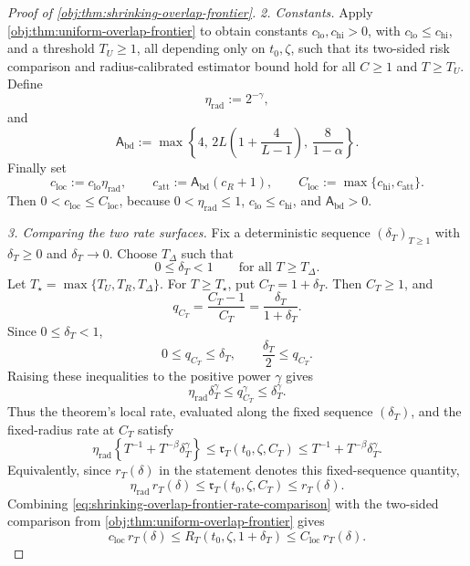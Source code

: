 \documentclass[11pt]{article}
\begin{document}
\begin{proof}[Proof of \cref{obj:thm:shrinking-overlap-frontier}]
\emph{2. Constants.}
Apply \cref{obj:thm:uniform-overlap-frontier} to obtain constants
\(c_{\mathrm{lo}},c_{\mathrm{hi}}>0\), with
\(c_{\mathrm{lo}}\le c_{\mathrm{hi}}\), and a threshold \(T_U\ge1\), all
depending only on \(t_0,\zeta\), such that its two-sided risk comparison and
radius-calibrated estimator bound hold for all \(C\ge1\) and \(T\ge T_U\).
Define
\[
\eta_{\mathrm{rad}}:=2^{-\gamma},
\]
and
\[
\mathsf A_{\mathrm{bd}}
:=
\max\left\{
4,\,
2L\left(1+\frac{4}{L-1}\right),\,
\frac{8}{1-\alpha}
\right\}.
\]
Finally set
\[
c_{\mathrm{loc}}:=c_{\mathrm{lo}}\eta_{\mathrm{rad}},
\qquad
c_{\mathrm{att}}:=\mathsf A_{\mathrm{bd}}(c_R+1),
\qquad
C_{\mathrm{loc}}:=\max\{c_{\mathrm{hi}},c_{\mathrm{att}}\}.
\]
Then \(0<c_{\mathrm{loc}}\le C_{\mathrm{loc}}\), because
\(0<\eta_{\mathrm{rad}}\le1\), \(c_{\mathrm{lo}}\le c_{\mathrm{hi}}\), and
\(\mathsf A_{\mathrm{bd}}>0\). %

\emph{3. Comparing the two rate surfaces.}
Fix a deterministic sequence \((\delta_T)_{T\ge1}\) with
\(\delta_T\ge0\) and \(\delta_T\to0\).  Choose \(T_\Delta\) such that
\[
0\le\delta_T<1\qquad\text{for all }T\ge T_\Delta .
\]
Let \(T_\star=\max\{T_U,T_R,T_\Delta\}\).  For \(T\ge T_\star\), put
\(C_T=1+\delta_T\).  Then \(C_T\ge1\), and
\[
q_{C_T}
=
\frac{C_T-1}{C_T}
=
\frac{\delta_T}{1+\delta_T}.
\]
Since \(0\le\delta_T<1\),
\[
0\le q_{C_T}\le\delta_T,
\qquad
\frac{\delta_T}{2}\le q_{C_T}.
\]
Raising these inequalities to the positive power \(\gamma\) gives
\[
\eta_{\mathrm{rad}}\delta_T^\gamma
\le
q_{C_T}^\gamma
\le
\delta_T^\gamma .
\]
Thus the theorem's local rate, evaluated along the fixed sequence \((\delta_T)\), and the fixed-radius rate at \(C_T\) satisfy
\begin{equation}\label{eq:shrinking-overlap-frontier-rate-comparison}
\eta_{\mathrm{rad}}\left\{T^{-1}+T^{-\beta}\delta_T^\gamma\right\}
\le
\mathfrak r_T(t_0,\zeta,C_T)
\le
T^{-1}+T^{-\beta}\delta_T^\gamma.
\end{equation}
Equivalently, since \(r_T(\delta)\) in the statement denotes this fixed-sequence quantity,
\[
\eta_{\mathrm{rad}}\,r_T(\delta)
\le
\mathfrak r_T(t_0,\zeta,C_T)
\le
r_T(\delta).
\]
Combining \cref{eq:shrinking-overlap-frontier-rate-comparison} with the two-sided comparison from
\cref{obj:thm:uniform-overlap-frontier} gives
\begin{equation}\label{eq:shrinking-overlap-frontier-risk-comparison}
c_{\mathrm{loc}}\,r_T(\delta)
\le
R_T(t_0,\zeta,1+\delta_T)
\le
C_{\mathrm{loc}}\,r_T(\delta).
\end{equation}


\end{proof}
\end{document}

